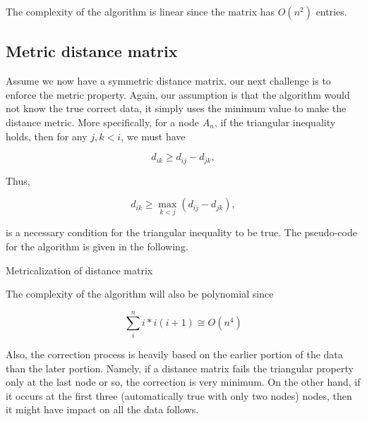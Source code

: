 The complexity of the algorithm is linear since the matrix 
has $O(n^2)$ entries.

\subsection{Metric distance matrix}
Assume we now have a symmetric distance matrix, our next 
challenge is to enforce the metric property. Again, 
our assumption is that the algorithm would not know the 
true correct data, it simply uses the minimum value to make 
the distance metric. More specifically, for a node $A_n$, 
if the triangular inequality holds, then for any $j,k < i$, 
we must have

\[
d_{ik} \geq d_{ij} - d_{jk},
\]

Thus,

\[
d_{ik} \geq \max_{k<j}(d_{ij} - d_{jk}),
\]

is a necessary condition for the triangular inequality to be true. 
The pseudo-code for the algorithm is given in the following.

\begin{algorithm}[H]
\SetAlgoRefName{}	
\caption{Metricalization of distance matrix}
\end{algorithm}

The complexity of the algorithm will also be polynomial since

\[
\sum_i^n i*i(i+1) \cong O(n^4)
\]

Also, the correction process is heavily based on the earlier 
portion of the data than the later portion. Namely, if a 
distance matrix fails the triangular property only at the 
last node or so, the correction is very minimum. 
On the other hand, if it occurs at the first three 
(automatically true with only two nodes) nodes, then it 
might have impact on all the data follows.

